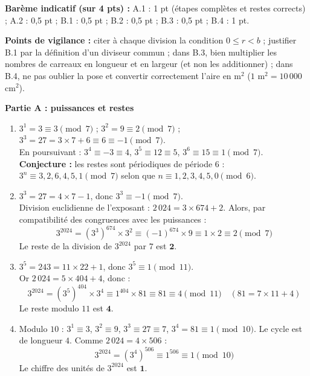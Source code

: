 \documentclass[11pt]{article}
\begin{document}
\begin{corrige}
\textbf{Barème indicatif (sur 4 pts) :} A.1 : 1 pt (étapes complètes et restes corrects) ; A.2 : 0,5 pt ; B.1 : 0,5 pt ; B.2 : 0,5 pt ; B.3 : 0,5 pt ; B.4 : 1 pt.

\textbf{Points de vigilance :} citer à chaque division la condition $0 \le r < b$ ; justifier B.1 par la définition d'un diviseur commun ; dans B.3, bien multiplier les nombres de carreaux en longueur et en largeur (et non les additionner) ; dans B.4, ne pas oublier la pose et convertir correctement l'aire en m$^2$ ($1$ m$^2 = 10\,000$ cm$^2$).
\end{corrige}

\begin{corrige}
\textbf{Partie A : puissances et restes}
\begin{enumerate}
\item $3^1 = 3 \equiv 3 \pmod{7}$ ; $3^2 = 9 \equiv 2 \pmod{7}$ ; $3^3 = 27 = 3 \times 7 + 6 \equiv 6 \equiv -1 \pmod{7}$. \\
En poursuivant : $3^4 \equiv -3 \equiv 4$, $3^5 \equiv 12 \equiv 5$, $3^6 \equiv 15 \equiv 1 \pmod{7}$. \\
\textbf{Conjecture :} les restes sont périodiques de période $6$ : $3^n \equiv 3, 2, 6, 4, 5, 1 \pmod{7}$ selon que $n \equiv 1, 2, 3, 4, 5, 0 \pmod{6}$.
\item $3^3 = 27 = 4 \times 7 - 1$, donc $3^3 \equiv -1 \pmod{7}$. \\
Division euclidienne de l'exposant : $2\,024 = 3 \times 674 + 2$. Alors, par compatibilité des congruences avec les puissances :
\[ 3^{2024} = (3^3)^{674} \times 3^2 \equiv (-1)^{674} \times 9 \equiv 1 \times 2 \equiv 2 \pmod{7} \]
Le reste de la division de $3^{2024}$ par $7$ est $\mathbf{2}$.
\item $3^5 = 243 = 11 \times 22 + 1$, donc $3^5 \equiv 1 \pmod{11}$. \\
Or $2\,024 = 5 \times 404 + 4$, donc :
\[ 3^{2024} = (3^5)^{404} \times 3^4 \equiv 1^{404} \times 81 \equiv 81 \equiv 4 \pmod{11} \quad (81 = 7 \times 11 + 4) \]
Le reste modulo $11$ est $\mathbf{4}$.
\item Modulo $10$ : $3^1 \equiv 3$, $3^2 \equiv 9$, $3^3 \equiv 27 \equiv 7$, $3^4 = 81 \equiv 1 \pmod{10}$. Le cycle est de longueur $4$. Comme $2\,024 = 4 \times 506$ :
\[ 3^{2024} = (3^4)^{506} \equiv 1^{506} \equiv 1 \pmod{10} \]
Le chiffre des unités de $3^{2024}$ est $\mathbf{1}$.
\end{enumerate}


\end{corrige}
\end{document}
